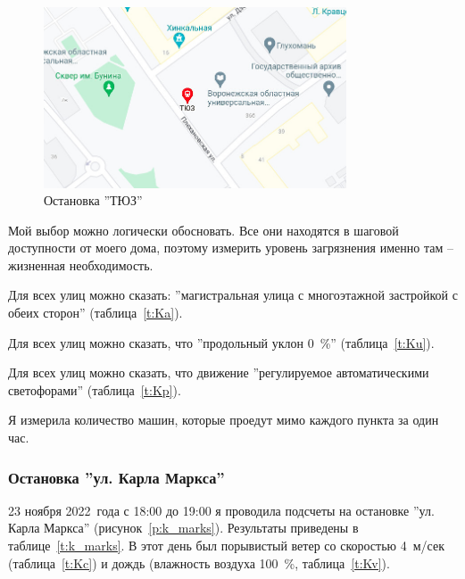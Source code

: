 \begin{figure}[H]%
  \centering
  \includegraphics[width=0.8\textwidth]{src/st_tuz.jpg}
  \caption{Остановка ''ТЮЗ''} \label{p:tuz}
\end{figure}%

Мой выбор можно логически обосновать. Все они находятся в шаговой доступности от моего
дома, поэтому измерить уровень загрязнения именно там – жизненная необходимость.

Для всех улиц можно сказать: ''магистральная улица с многоэтажной застройкой с обеих сторон'' (таблица~\ref{t:Ka}).

Для всех улиц можно сказать, что ''продольный уклон 0~\%'' (таблица~\ref{t:Ku}).

Для всех улиц можно сказать, что движение ''регулируемое автоматическими светофорами'' (таблица~\ref{t:Kp}).





Я измерила количество машин, которые проедут мимо каждого пункта за один час.


\subsubsection{Остановка ''ул. Карла Маркса''}



23 ноября 2022~года с 18:00 до 19:00 я проводила подсчеты на остановке ''ул. Карла Маркса'' (рисунок~\ref{p:k_marks}). Результаты приведены в таблице~\ref{t:k_marks}. В этот день был порывистый ветер со скоростью 4~м/сек (таблица~\ref{t:Kc}) и дождь (влажность воздуха 100~\%, таблица~\ref{t:Kv}).

